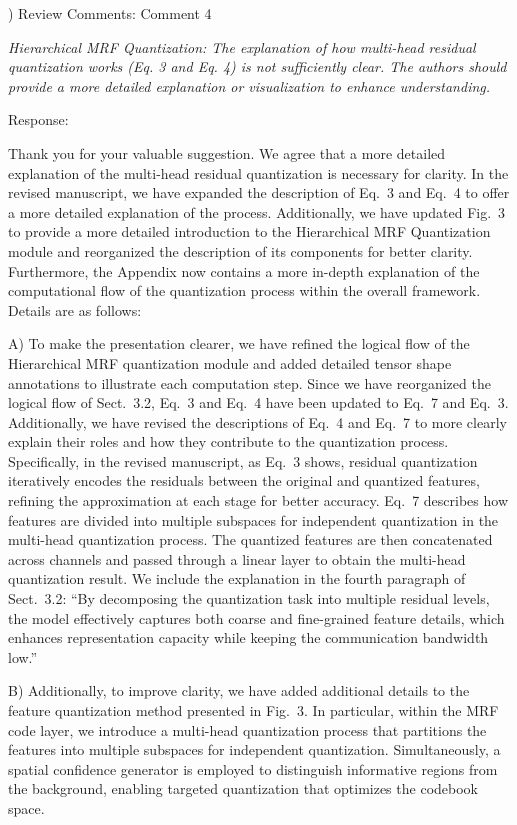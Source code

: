 \documentclass[12pt,a4paper]{article}
\begin{document}
\vspace{4ex}
) Review Comments: Comment 4

\textit{Hierarchical MRF Quantization: The explanation of how multi-head residual quantization works (Eq. 3 and Eq. 4) is not sufficiently clear. The authors should provide a more detailed explanation or visualization to enhance understanding.}

\noindent Response:

Thank you for your valuable suggestion. We agree that a more detailed explanation of the multi-head residual quantization is necessary for clarity. In the revised manuscript, we have expanded the description of Eq.~3 and Eq.~4 to offer a more detailed explanation of the process. Additionally, we have updated Fig.~3 to provide a more detailed introduction to the Hierarchical MRF Quantization module and reorganized the description of its components for better clarity. Furthermore, the Appendix now contains a more in-depth explanation of the computational flow of the quantization process within the overall framework.
Details are as follows:

A) To make the presentation clearer, we have refined the logical flow of the Hierarchical MRF quantization module and added detailed tensor shape annotations to illustrate each computation step. Since we have reorganized the logical flow of Sect.~3.2, Eq.~3 and Eq.~4 have been updated to Eq.~7 and Eq.~3. Additionally, we have revised the descriptions of Eq.~4 and Eq.~7 to more clearly explain their roles and how they contribute to the quantization process. 
Specifically, in the revised manuscript, as Eq.~3 shows, residual quantization iteratively encodes the residuals between the original and quantized features, refining the approximation at each stage for better accuracy. Eq.~7 describes how features are divided into multiple subspaces for independent quantization in the multi-head quantization process. The quantized features are then concatenated across channels and passed through a linear layer to obtain the multi-head quantization result. We include the explanation in the fourth paragraph of Sect.~3.2: ``By decomposing the quantization task into multiple residual levels, the model effectively captures both coarse and fine-grained feature details, which enhances representation capacity while keeping the communication bandwidth low.''


B) Additionally, to improve clarity, we have added additional details to the feature quantization method presented in Fig.~3. In particular, within the MRF code layer, we introduce a multi-head quantization process that partitions the features into multiple subspaces for independent quantization. Simultaneously, a spatial confidence generator is employed to distinguish informative regions from the background, enabling targeted quantization that optimizes the codebook space.
\end{document}
